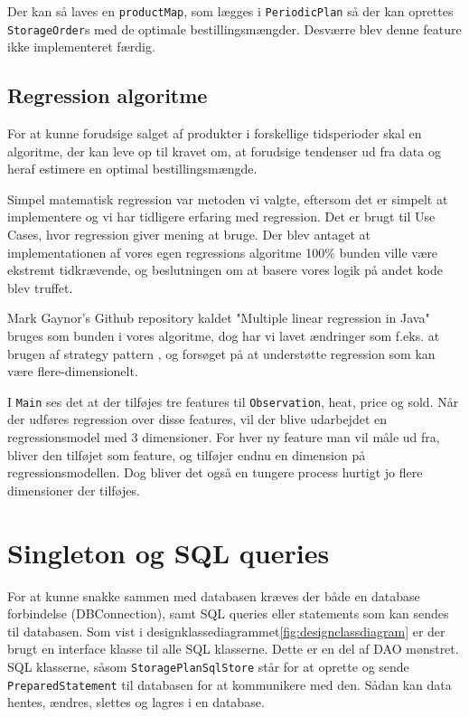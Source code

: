 Der kan så laves en \verb|productMap|, som lægges i \verb|PeriodicPlan| så der kan oprettes \verb|StorageOrder|s med de optimale bestillingsmængder. Desværre blev denne feature ikke implementeret færdig.

\subsection{Regression algoritme}
For at kunne forudsige salget af produkter i forskellige tidsperioder skal en algoritme, der kan leve op til kravet om, at forudsige tendenser ud fra data og heraf estimere en optimal bestillingsmængde.

Simpel matematisk regression var metoden vi valgte, eftersom det er simpelt at implementere og vi har tidligere erfaring med regression. Det er brugt til Use Cases, hvor regression giver mening at bruge. Der blev antaget at implementationen af vores egen regressions algoritme 100\% bunden ville være ekstremt tidkrævende, og beslutningen om at basere vores logik på andet kode blev truffet.

Mark Gaynor's Github repository kaldet "Multiple linear regression in Java" \cite{MarkGaynorRegressin} bruges som bunden i vores algoritme, dog har vi lavet ændringer som f.eks. at brugen af strategy pattern \cite{Larman2004}, og forsøget på at understøtte regression som kan være flere-dimensionelt. 

I \texttt{Main} ses det at der tilføjes tre features til \texttt{Observation}, heat, price og sold. Når der udføres regression over disse features, vil der blive udarbejdet en regressionsmodel med 3 dimensioner. For hver ny feature man vil måle ud fra, bliver den tilføjet som feature, og tilføjer endnu en dimension på regressionsmodellen. Dog bliver det også en tungere process hurtigt jo flere dimensioner der tilføjes. 

\section{Singleton og SQL queries}
For at kunne snakke sammen med databasen kræves der både en database forbindelse (DBConnection), samt SQL queries eller statements som kan sendes til databasen. Som vist i designklassediagrammet\ref{fig:designclassdiagram} er der brugt en interface klasse til alle SQL klasserne. Dette er en del af DAO mønstret\cite{DAO}. SQL klasserne, såsom \texttt{StoragePlanSqlStore} står for at oprette og sende \texttt{PreparedStatement} til databasen for at kommunikere med den. Sådan kan data hentes, ændres, slettes og lagres i en database. 

